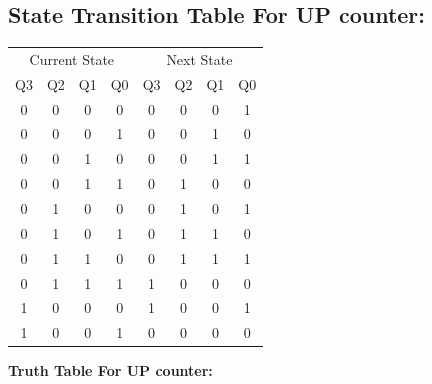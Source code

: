 \documentclass[a4paper,12pt]{article}
\begin{document}
\subsection{\textbf{State Transition Table For UP counter:}}
\begin{table}[H]
    \centering
    \begin{tabular}{c c c c | c c c c}
        \toprule
        \multicolumn{4}{c|}{Current State} & \multicolumn{4}{c}{Next State} \\
	    Q3 & Q2 & Q1 & Q0 & Q3 & Q2 & Q1 & Q0 \\
        \midrule
	    0 & 0 & 0 & 0 & 0 & 0 & 0 & 1 \\
	    0 & 0 & 0 & 1 & 0 & 0 & 1 & 0 \\
	    0 & 0 & 1 & 0 & 0 & 0 & 1 & 1 \\
	    0 & 0 & 1 & 1 & 0 & 1 & 0 & 0 \\
	    0 & 1 & 0 & 0 & 0 & 1 & 0 & 1 \\
	    0 & 1 & 0 & 1 & 0 & 1 & 1 & 0 \\
	    0 & 1 & 1 & 0 & 0 & 1 & 1 & 1 \\
	    0 & 1 & 1 & 1 & 1 & 0 & 0 & 0 \\
	    1 & 0 & 0 & 0 & 1 & 0 & 0 & 1 \\
	    1 & 0 & 0 & 1 & 0 & 0 & 0 & 0 \\
        \bottomrule
    \end{tabular}
\end{table}
\textbf{Truth Table For UP counter:}
\end{document}
